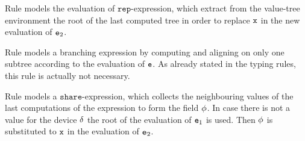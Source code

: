 Rule  models the evaluation of $\mathtt{rep}$-expression, which extract from the value-tree environment the root of the last computed tree in order to replace $\mathtt{x}$ in the new evaluation of $\mathtt{e}_2$.

Rule  models a branching expression by computing and aligning on only one subtree according to the evaluation of $\mathtt{e}$. As already stated in the typing rules, this rule is actually not necessary.

Rule  models a $\mathtt{share}$-expression, which collects the neighbouring values of the last computations of the expression to form the field $\phi$. In case there is not a value for the device $\delta$ the root of the evaluation of $\mathtt{e}_1$ is used. Then $\phi$ is substituted to $\mathtt{x}$ in the evaluation of $\mathtt{e}_2$.

